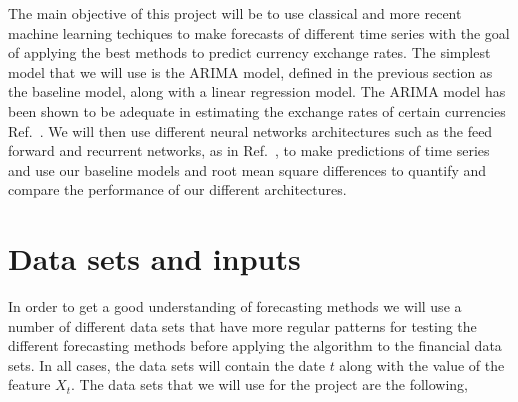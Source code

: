 \documentclass[10pt,a4paper]{article}
\begin{document}

The main objective of this project will be to use classical and more recent machine learning techiques to make forecasts of different time series with the goal of applying the best methods to predict currency exchange rates. The simplest model that we will use is the ARIMA model, defined in the previous section as the baseline model, along with a linear regression model. The ARIMA model has been shown to be adequate in estimating the exchange rates of certain currencies Ref.~\cite{Mong_2016}. We will then use different neural networks architectures such as the feed forward and recurrent networks, as in Ref.~\cite{Chaudhuri_2016,Oancea_2014,Pant_2018}, to make predictions of time series and use our baseline models and root mean square differences to quantify and compare the performance of our different architectures.

\section{Data sets and inputs}


In order to get a good understanding of forecasting methods we will use a number of different data sets that have more regular patterns for testing the different forecasting methods before applying the algorithm to the financial data sets. In all cases, the data sets will contain the date $t$ along with the value of the feature $X_t$. The data sets that we will use for the project are the following,
\end{document}
